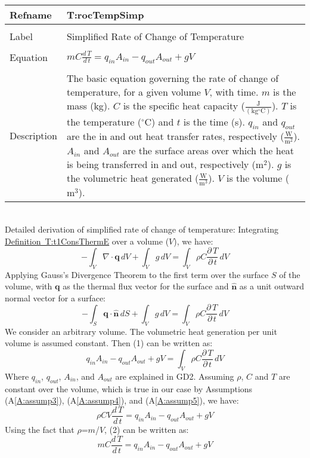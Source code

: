 \documentclass[12pt]{article}
\begin{document}
\noindent \begin{minipage}{\textwidth}
\begin{tabular}{p{} p{}}
\toprule \textbf{Refname} & \textbf{T:rocTempSimp}
\label{T:rocTempSimp}
\\ \midrule \\
Label & Simplified Rate of Change of Temperature
\\ \midrule \\
Equation & $m C \frac{d\,T}{d\,t}={q_{in}} {A_{in}}-{q_{out}} {A_{out}}+g V$
\\ \midrule \\
Description & The basic equation governing the rate of change of temperature, for a given volume $V$, with time. $m$ is the mass (kg). $C$ is the specific heat capacity ($\frac{\text{J}}{(\text{kg}{}^{\circ}\text{C})}$). $T$ is the temperature (${}^{\circ}$C) and $t$ is the time (s). ${q_{in}}$ and ${q_{out}}$ are the in and out heat transfer rates, respectively ($\frac{\text{W}}{\text{m}^{2}}$). ${A_{in}}$ and ${A_{out}}$ are the surface areas over which the heat is being transferred in and out, respectively ($\text{m}^{2}$). $g$ is the volumetric heat generated ($\frac{\text{W}}{\text{m}^{3}}$). $V$ is the volume ($\text{m}^{3}$).
\\ \bottomrule \end{tabular}
\end{minipage}\\
Detailed derivation of simplified rate of change of temperature:
Integrating \hyperref[T:t1ConsThermE]{Definition~T:t1ConsThermE} over a volume ($V$), we have:
\begin{dmath}
-\int_{V}{\nabla{}\cdot{}\mathbf{q}}\,dV+\int_{V}{g}\,dV=\int_{V}{\rho{} C \frac{\partial{}\,T}{\partial{}\,t}}\,dV
\end{dmath}
Applying Gauss's Divergence Theorem to the first term over the surface $S$ of the volume, with $\mathbf{q}$ as the thermal flux vector for the surface and $\mathbf{\hat{n}}$ as a unit outward normal vector for a surface:
\begin{dmath}
-\int_{S}{\mathbf{q}\cdot{}\mathbf{\hat{n}}}\,dS+\int_{V}{g}\,dV=\int_{V}{\rho{} C \frac{\partial{}\,T}{\partial{}\,t}}\,dV
\end{dmath}
We consider an arbitrary volume. The volumetric heat generation per unit volume is assumed constant. Then (1) can be written as:
\begin{dmath}
{q_{in}} {A_{in}}-{q_{out}} {A_{out}}+g V=\int_{V}{\rho{} C \frac{\partial{}\,T}{\partial{}\,t}}\,dV
\end{dmath}
Where ${q_{in}}$, ${q_{out}}$, ${A_{in}}$, and ${A_{out}}$ are explained in GD2. Assuming $\rho{}$, $C$ and $T$ are constant over the volume, which is true in our case by Assumptions (A\ref{A:assump3}), (A\ref{A:assump4}), and (A\ref{A:assump5}), we have:
\begin{dmath}
\rho{} C V \frac{d\,T}{d\,t}={q_{in}} {A_{in}}-{q_{out}} {A_{out}}+g V
\end{dmath}
Using the fact that $\rho{}$=$m$/$V$, (2) can be written as:
\begin{dmath}
m C \frac{d\,T}{d\,t}={q_{in}} {A_{in}}-{q_{out}} {A_{out}}+g V
\end{dmath}
\end{document}

